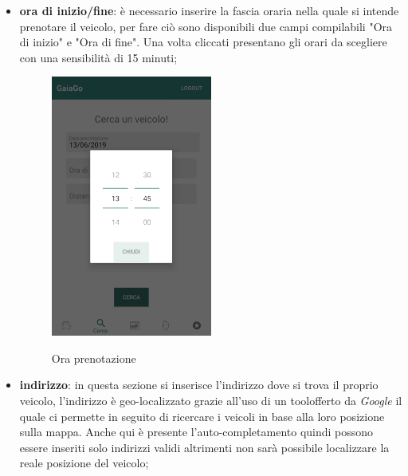 \begin{itemize}
 \item \textbf{ora di inizio/fine}: è necessario inserire la fascia oraria nella quale si intende prenotare il veicolo, per fare ciò sono disponibili due campi compilabili "Ora di inizio" e "Ora di fine". Una volta cliccati presentano gli orari da scegliere con una sensibilità di 15 minuti;
  \begin{figure}[H] 
 	\centering 
 	\includegraphics[width=0.5\textwidth]{res/images/ora_inizio.png}\\
 	\caption{Ora prenotazione}
 	\label{ora}
 \end{figure}
 
 \item \textbf{indirizzo}: in questa sezione si inserisce l'indirizzo dove si trova il proprio veicolo, l'indirizzo è geo-localizzato grazie all'uso di un tool\glosp offerto da \textit{Google} il quale ci permette in seguito di ricercare i veicoli in base alla loro posizione sulla mappa. Anche qui è presente l'auto-completamento quindi possono essere inseriti solo indirizzi validi altrimenti non sarà possibile localizzare la reale posizione del veicolo;
\end{itemize}
\pagebreak


